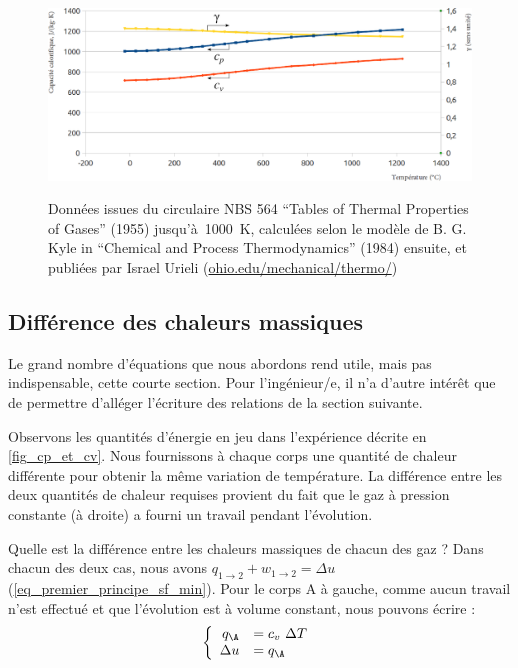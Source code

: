 		\begin{figure}
			\begin{center}
				\includegraphics[width=15cm, inner]{images/valeurs_cp_cv_air.png}
			\end{center}
				{Données issues du circulaire NBS 564 “Tables of Thermal Properties of Gases” (1955) jusqu’à~\SI{1000}{\kelvin}, calculées selon le modèle de B. G. Kyle in “Chemical and Process Thermodynamics” (1984) ensuite, et publiées par Israel Urieli (\href{http ://www.ohio.edu/mechanical/thermo/}{ohio.edu/mechanical/thermo/})}
		\label{fig_valeurs_de_cp_cv_gamma}
		\end{figure}




	\subsection{Différence des chaleurs massiques}

		Le grand nombre d’équations que nous abordons rend utile, mais pas indispensable, cette courte section. Pour l’ingénieur/e, il n’a d’autre intérêt que de permettre d’alléger l’écriture des relations de la section suivante.

		Observons les quantités d’énergie en jeu dans l’expérience décrite en \cref{fig_cp_et_cv}. Nous fournissons à chaque corps une quantité de chaleur différente pour obtenir la même variation de température. La différence entre les deux quantités de chaleur requises provient du fait que le gaz à pression constante (à droite) a fourni un travail pendant l’évolution.

		Quelle est la différence entre les chaleurs massiques de chacun des gaz ? Dans chacun des deux cas, nous avons $q_{1 \to 2} + w_{1 \to 2} = \Delta u$ (\ref{eq_premier_principe_sf_min}). Pour le corps A à gauche, comme aucun travail n’est effectué et que l’évolution est à volume constant, nous pouvons écrire :
			\begin{equation}
				\left\{
					\begin{array}{rl}
						q_\A 		& = c_v \ \Delta T \\
						\Delta u 			& = q_\A 
					\end{array} \right.
			\label{eq_sectionmathschiante_0}
			\end{equation}

